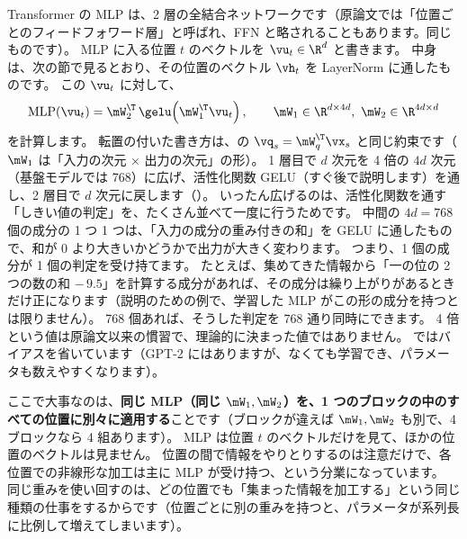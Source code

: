 Transformer の MLP は、2 層の全結合ネットワークです（原論文では「位置ごとのフィードフォワード層」と呼ばれ、FFN と略されることもあります。同じものです）。
MLP に入る位置 $t$ のベクトルを $\vu_t\in\R^d$ と書きます。
中身は、次の節で見るとおり、その位置のベクトル $\vh_t$ を LayerNorm に通したものです。
この $\vu_t$ に対して、
\begin{equation}
\mathrm{MLP}(\vu_t) = \mW_2^\T\,\gelu\!\left(\mW_1^\T \vu_t\right),\qquad
\mW_1\in\R^{d\times 4d},\ \mW_2\in\R^{4d\times d}
\label{eq:tf-mlp}
\end{equation}
を計算します。
転置の付いた書き方は、の $\vq_s=\mW_q^\T\vx_s$ と同じ約束です（$\mW_1$ は「入力の次元 × 出力の次元」の形）。
1 層目で $d$ 次元を 4 倍の $4d$ 次元（基盤モデルでは 768）に広げ、活性化関数 GELU（すぐ後で説明します）を通し、2 層目で $d$ 次元に戻します（）。
いったん広げるのは、活性化関数を通す「しきい値の判定」を、たくさん並べて一度に行うためです。
中間の $4d=768$ 個の成分の 1 つ 1 つは、「入力の成分の重み付きの和」を GELU に通したもので、和が 0 より大きいかどうかで出力が大きく変わります。
つまり、1 個の成分が 1 個の判定を受け持てます。
たとえば、集めてきた情報から「一の位の 2 つの数の和 $-\,9.5$」を計算する成分があれば、その成分は繰り上がりがあるときだけ正になります（説明のための例で、学習した MLP がこの形の成分を持つとは限りません）。
768 個あれば、そうした判定を 768 通り同時にできます。
4 倍という値は原論文\cite{vaswani2017attention}以来の慣習で、理論的に決まった値ではありません。
 ではバイアスを省いています（GPT-2 にはありますが、なくても学習でき、パラメータも数えやすくなります）。

ここで大事なのは、\textbf{同じ MLP（同じ $\mW_1,\mW_2$）を、1 つのブロックの中のすべての位置に別々に適用する}ことです（ブロックが違えば $\mW_1,\mW_2$ も別で、4 ブロックなら 4 組あります）。
MLP は位置 $t$ のベクトルだけを見て、ほかの位置のベクトルは見ません。
位置の間で情報をやりとりするのは注意だけで、各位置での非線形な加工は主に MLP が受け持つ、という分業になっています。
同じ重みを使い回すのは、どの位置でも「集まった情報を加工する」という同じ種類の仕事をするからです（位置ごとに別の重みを持つと、パラメータが系列長に比例して増えてしまいます）。

